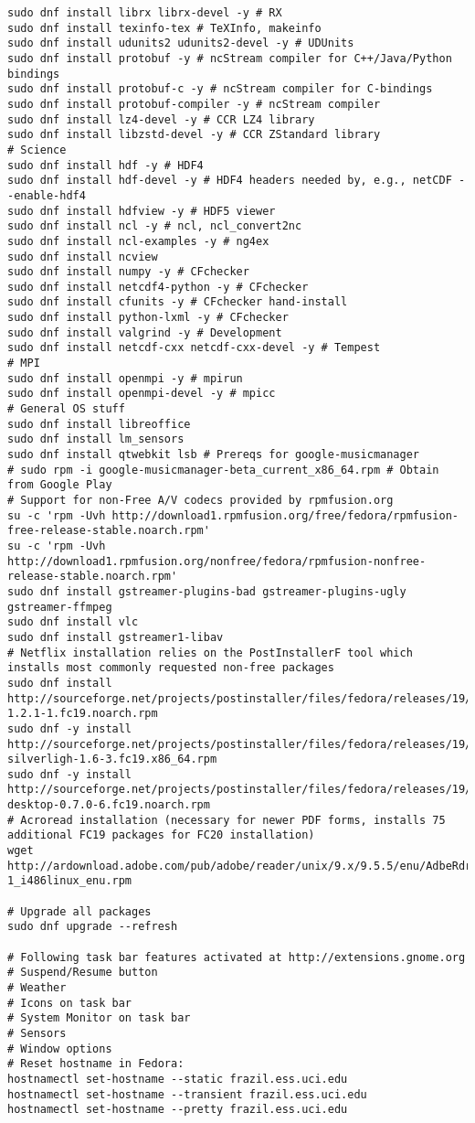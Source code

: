 \documentclass[12pt,twoside]{article}
\begin{document}
\begin{verbatim}
sudo dnf install librx librx-devel -y # RX
sudo dnf install texinfo-tex # TeXInfo, makeinfo
sudo dnf install udunits2 udunits2-devel -y # UDUnits
sudo dnf install protobuf -y # ncStream compiler for C++/Java/Python bindings
sudo dnf install protobuf-c -y # ncStream compiler for C-bindings
sudo dnf install protobuf-compiler -y # ncStream compiler
sudo dnf install lz4-devel -y # CCR LZ4 library
sudo dnf install libzstd-devel -y # CCR ZStandard library
# Science
sudo dnf install hdf -y # HDF4
sudo dnf install hdf-devel -y # HDF4 headers needed by, e.g., netCDF --enable-hdf4
sudo dnf install hdfview -y # HDF5 viewer
sudo dnf install ncl -y # ncl, ncl_convert2nc
sudo dnf install ncl-examples -y # ng4ex
sudo dnf install ncview
sudo dnf install numpy -y # CFchecker
sudo dnf install netcdf4-python -y # CFchecker
sudo dnf install cfunits -y # CFchecker hand-install
sudo dnf install python-lxml -y # CFchecker
sudo dnf install valgrind -y # Development
sudo dnf install netcdf-cxx netcdf-cxx-devel -y # Tempest
# MPI
sudo dnf install openmpi -y # mpirun
sudo dnf install openmpi-devel -y # mpicc
# General OS stuff
sudo dnf install libreoffice
sudo dnf install lm_sensors
sudo dnf install qtwebkit lsb # Prereqs for google-musicmanager
# sudo rpm -i google-musicmanager-beta_current_x86_64.rpm # Obtain from Google Play
# Support for non-Free A/V codecs provided by rpmfusion.org
su -c 'rpm -Uvh http://download1.rpmfusion.org/free/fedora/rpmfusion-free-release-stable.noarch.rpm'
su -c 'rpm -Uvh http://download1.rpmfusion.org/nonfree/fedora/rpmfusion-nonfree-release-stable.noarch.rpm'
sudo dnf install gstreamer-plugins-bad gstreamer-plugins-ugly gstreamer-ffmpeg
sudo dnf install vlc
sudo dnf install gstreamer1-libav
# Netflix installation relies on the PostInstallerF tool which installs most commonly requested non-free packages
sudo dnf install http://sourceforge.net/projects/postinstaller/files/fedora/releases/19/x86_64/updates/postinstallerf-1.2.1-1.fc19.noarch.rpm 
sudo dnf -y install http://sourceforge.net/projects/postinstaller/files/fedora/releases/19/x86_64/updates/wine-silverligh-1.6-3.fc19.x86_64.rpm
sudo dnf -y install http://sourceforge.net/projects/postinstaller/files/fedora/releases/19/x86_64/updates/netflix-desktop-0.7.0-6.fc19.noarch.rpm
# Acroread installation (necessary for newer PDF forms, installs 75 additional FC19 packages for FC20 installation)
wget http://ardownload.adobe.com/pub/adobe/reader/unix/9.x/9.5.5/enu/AdbeRdr9.5.5-1_i486linux_enu.rpm

# Upgrade all packages
sudo dnf upgrade --refresh

# Following task bar features activated at http://extensions.gnome.org
# Suspend/Resume button
# Weather
# Icons on task bar
# System Monitor on task bar
# Sensors
# Window options
# Reset hostname in Fedora:
hostnamectl set-hostname --static frazil.ess.uci.edu
hostnamectl set-hostname --transient frazil.ess.uci.edu
hostnamectl set-hostname --pretty frazil.ess.uci.edu
\end{verbatim}
\end{document}

